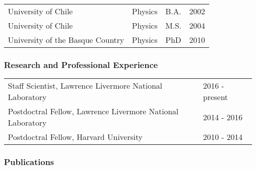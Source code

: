 \begin{table}[ht]
    \centering
    \begin{tabular}{llll}
        University of Chile & Physics & B.A. & 2002  \\
        University of Chile & Physics & M.S. & 2004 \\
        University of the Basque Country & Physics & PhD & 2010\\
    \end{tabular}
\end{table}

\subsubsection*{Research and Professional Experience}

\begin{table}[ht]
    \centering
    \begin{tabular}{ll}
Staff Scientist, Lawrence Livermore National Laboratory &       2016 - present   \\
Postdoctral Fellow, Lawrence Livermore National Laboratory     &  2014 - 2016   \\
Postdoctral Fellow, Harvard University &       2010 - 2014 \\
    \end{tabular}
\end{table}

\subsubsection*{Publications}

